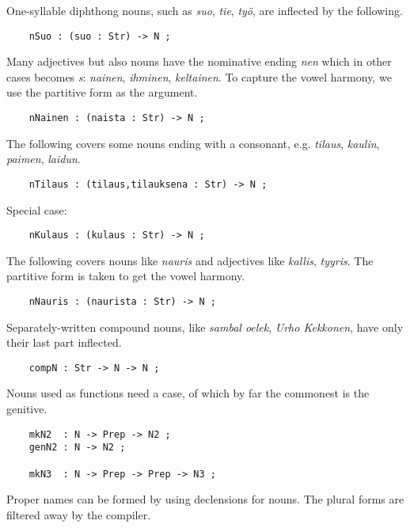 \documentclass[11pt,a4paper]{article}
\begin{document}
One-syllable diphthong nouns, such as \textit{suo}, \textit{tie}, \textit{työ}, are inflected by
the following.

\begin{verbatim}
    nSuo : (suo : Str) -> N ;
\end{verbatim}

Many adjectives but also nouns have the nominative ending \textit{nen} which in other
cases becomes \textit{s}: \textit{nainen}, \textit{ihminen}, \textit{keltainen}. 
To capture the vowel harmony, we use the partitive form as the argument.

\begin{verbatim}
    nNainen : (naista : Str) -> N ;
\end{verbatim}

The following covers some nouns ending with a consonant, e.g.
\textit{tilaus}, \textit{kaulin}, \textit{paimen}, \textit{laidun}.

\begin{verbatim}
    nTilaus : (tilaus,tilauksena : Str) -> N ;
\end{verbatim}

Special case:

\begin{verbatim}
    nKulaus : (kulaus : Str) -> N ;
\end{verbatim}

The following covers nouns like \textit{nauris} and adjectives like \textit{kallis}, \textit{tyyris}.
The partitive form is taken to get the vowel harmony.

\begin{verbatim}
    nNauris : (naurista : Str) -> N ;
\end{verbatim}

Separately-written compound nouns, like \textit{sambal oelek}, \textit{Urho Kekkonen},
have only their last part inflected.

\begin{verbatim}
    compN : Str -> N -> N ;
\end{verbatim}

Nouns used as functions need a case, of which by far the commonest is
the genitive.

\begin{verbatim}
    mkN2  : N -> Prep -> N2 ;
    genN2 : N -> N2 ;
  
    mkN3  : N -> Prep -> Prep -> N3 ;
\end{verbatim}

Proper names can be formed by using declensions for nouns.
The plural forms are filtered away by the compiler.
\end{document}
